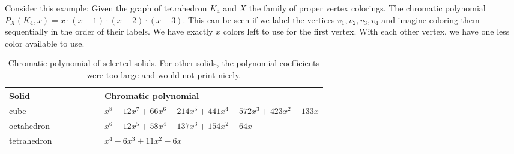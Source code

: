 Consider this example: Given the graph of tetrahedron $K_4$ and $X$ the family of proper vertex colorings. The chromatic polynomial $P_{X}(K_4,x) = x \cdot (x-1) \cdot (x-2) \cdot (x-3)$. This can be seen if we label the vertices $v_1,v_2,v_3,v_4$ and imagine coloring them sequentially in the order of their labels. We have exactly $x$ colors left to use for the first vertex. With each other vertex, we have one less color available to use. 

\begin{table}[H]
\centering
\begin{tabular}{lp{0.7\linewidth}}
\toprule
\textbf{Solid} & \textbf{Chromatic polynomial} \\
\midrule
cube & $x^{8} - 12x^{7} + 66x^{6} - 214x^{5} + 441x^{4} - 572x^{3} + 423x^{2} - 133x$ \\
octahedron & $x^{6} - 12x^{5} + 58x^{4} - 137x^{3} + 154x^{2} - 64x$ \\
tetrahedron & $x^{4} - 6x^{3} + 11x^{2} - 6x$ \\
\bottomrule
\end{tabular}
\caption{Chromatic polynomial of selected solids. For other solids, the polynomial coefficients were too large and would not print nicely.}
\label{tab:selected-chrom-polys}
\end{table}


